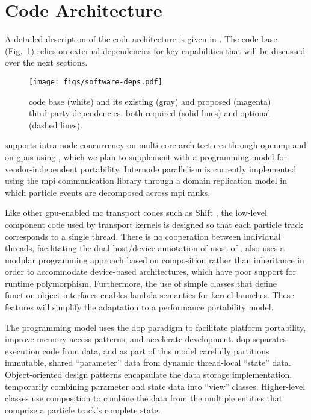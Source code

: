 \section{Code Architecture}

A detailed description of the \celeritas code architecture is given in
\textcite{johnson_2021}. The code base (Fig.~\ref{fig:celeritas-code-base})
relies on external dependencies for key capabilities that will be discussed over
the next sections.
\begin{figure}
  \centering
  \texttt{[image: figs/software-deps.pdf]}
  \caption{\celeritas code base (white) and its existing (gray) and proposed
    (magenta) third-party dependencies, both required (solid lines) and optional
    (dashed lines).}
  \label{fig:celeritas-code-base}
\end{figure}

\celeritas supports intra-node concurrency on multi-core architectures through
\acs{openmp} and on \nvidia \acp{gpu} using \cuda, which we plan to supplement
with a programming model for vendor-independent portability.  Internode
parallelism is currently implemented using the \ac{mpi} communication library
through a domain replication model in which particle events are decomposed
across \ac{mpi} ranks.

Like other \ac{gpu}-enabled \ac{mc} transport codes such as Shift
\cite{pandya_implementation_2016,hamilton_multigroup_2018,
hamilton_continuous-energy_2019,hamilton_domain_2022}, the low-level component
code used by transport kernels is designed so that each particle track
corresponds to a single thread. There is no cooperation between individual
threads, facilitating the dual host/device annotation of most of \celeritas.
\celeritas also uses a modular programming approach based on composition rather
than inheritance in order to accommodate device-based architectures, which have
poor support for runtime polymorphism.  Furthermore, the use of simple classes
that define function-object interfaces enables lambda semantics for kernel
launches. These features will simplify the adaptation to a performance
portability model.

The \celeritas programming model uses the \ac{dop} paradigm \cite{dop_2022} to
facilitate platform portability, improve memory access patterns, and accelerate
development. \ac{dop} separates execution code from data, and as part of this
model \celeritas carefully partitions immutable, shared ``parameter'' data from
dynamic thread-local ``state'' data. Object-oriented design patterns encapsulate
the data storage implementation, temporarily combining parameter and state data
into ``view'' classes.  Higher-level classes use composition to combine the data
from the multiple entities that comprise a particle track's complete state.

